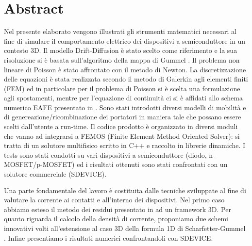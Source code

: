\chapter{Abstract}

Nel presente elaborato vengono illustrati gli strumenti matematici necessari al fine di simulare il comportamento elettrico dei dispositivi a semiconduttore in un contesto 3D. Il modello Drift-Diffusion \cite{Jackson:ElettroClassica} \`e stato scelto come riferimento e la sua risoluzione si \`e basata sull'algoritmo della mappa di Gummel \cite{GummelMap}. Il problema non lineare di Poisson \`e stato affrontato con il metodo di Newton. La discretizzazione delle equazioni \`e stata realizzata secondo il metodo di Galerkin agli elementi finiti (FEM) ed in particolare per il problema di Poisson si \`e scelta una formulazione agli spostamenti, mentre per l'equazione di continuit\`a ci si \`e affidati allo schema numerico EAFE presentato in \cite{Zikatanov:EAFE1}.
Sono stati introdotti diversi modelli di mobilit\`a e di genereazione/ricombinazione dei portatori in maniera tale che possano essere scelti dall'utente a run-time.
Il codice prodotto \`e organizzato in diversi moduli che vanno ad integrarsi a FEMOS (Finite Element Method Oriented Solver): si tratta di un solutore multifisico scritto in C++ e raccolto in librerie dinamiche.
I tests sono stati condotti su vari dispositivi a semiconduttore (diodo, n-MOSFET/p-MOSFET) ed i risultati ottenuti sono stati confrontati con un solutore commerciale (SDEVICE).

Una parte fondamentale del lavoro \`e costituita dalle tecniche sviluppate al fine di valutare la corrente ai contatti e all'interno dei dispositivi. Nel primo caso abbiamo esteso il metodo dei residui  presentato in \cite{ContactCurrentRM} ad un framework 3D. Per quanto riguarda il calcolo della densit\`a di corrente, proponiamo due schemi innovativi volti all'estensione al caso 3D della formula 1D di Scharfetter-Gummel \cite{Gummel:SignAnalys}. Infine presentiamo i risultati numerici confrontandoli con SDEVICE.
